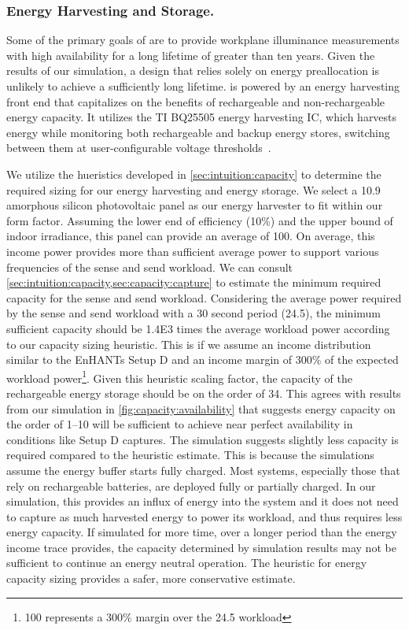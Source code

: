 \subsubsection{Energy Harvesting and Storage.}
Some of the primary goals of \name are to provide workplane illuminance measurements with high availability for a long lifetime of greater than ten years. 
Given the results of our simulation, a design that relies solely on energy preallocation is unlikely to achieve a sufficiently long lifetime. 
\name is powered by an energy harvesting front end that capitalizes on the benefits
of rechargeable and non-rechargeable energy capacity. 
It utilizes the TI BQ25505 energy harvesting IC, which
harvests energy while monitoring both
rechargeable and backup energy stores,
switching between them at user-configurable voltage thresholds~\cite{bq25505}. 

We utilize the hueristics developed in \cref{sec:intuition:capacity} to determine the required sizing for our energy harvesting and energy storage. 
We select a 10.9\ssi{\centi\meter\squared} amorphous
silicon photovoltaic panel as our energy harvester to fit within our form factor.
Assuming the lower end of efficiency (10\%) and the upper bound of indoor irradiance, this panel can provide an average of 100\ssi{\micro\watt}. 
On average, this income power provides more than sufficient average power to support various frequencies of the sense and send workload.
We can consult \cref{sec:intuition:capacity,sec:capacity:capture} to estimate the minimum required capacity for the sense and send workload.
Considering the average power required by the sense and send workload with a 30 second period (24.5\ssi{\micro\watt}), 
the minimum sufficient capacity should be \num{1.4E3} times the average workload power according to our capacity sizing heuristic. 
This is if we assume an income distribution similar to the EnHANTs Setup D and an income margin of 300\% of the expected workload power\footnote{100\ssi{\micro\watt} represents a 300\% margin over the 24.5\ssi{\micro\watt} workload}.
Given this heuristic scaling factor, the capacity of the rechargeable energy storage should be on the order of 34\ssi{\milli\Wh}.
This agrees with results from our simulation in \cref{fig:capacity:availability} that suggests energy capacity on the order of 1--10\ssi{\milli\Wh} will be sufficient to achieve near perfect availability in conditions like Setup D captures.
The simulation suggests slightly less capacity is required compared to the heuristic estimate.
This is because the simulations assume the energy buffer starts fully charged.
Most systems, especially those that rely on rechargeable batteries, are deployed fully or partially charged.
In our simulation, this provides an influx of energy into the system and it does not need to capture as much harvested energy to power its workload, and thus requires less energy capacity.
If simulated for more time, over a longer period than the energy income trace provides, the capacity determined by simulation results may not be sufficient to continue an energy neutral operation.
The heuristic for energy capacity sizing provides a safer, more conservative estimate. 

